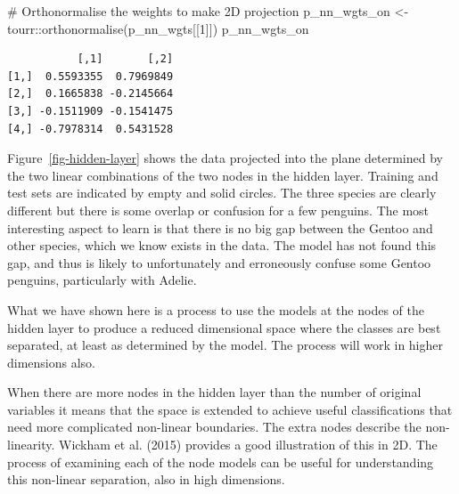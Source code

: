 \documentclass[
  letterpaper,
]{krantz}
\newenvironment{Shaded}{\begin{snugshade}}{\end{snugshade}}
\newcommand{\CommentTok}[1]{\textcolor[rgb]{0.37,0.37,0.37}{#1}}
\newcommand{\DecValTok}[1]{\textcolor[rgb]{0.68,0.00,0.00}{#1}}
\newcommand{\FunctionTok}[1]{\textcolor[rgb]{0.28,0.35,0.67}{#1}}
\newcommand{\NormalTok}[1]{\textcolor[rgb]{0.00,0.23,0.31}{#1}}
\newcommand{\OtherTok}[1]{\textcolor[rgb]{0.00,0.23,0.31}{#1}}
\newcommand{\SpecialCharTok}[1]{\textcolor[rgb]{0.37,0.37,0.37}{#1}}
\begin{document}
\begin{Shaded}
\begin{Highlighting}[]
\CommentTok{\# Orthonormalise the weights to make 2D projection}
\NormalTok{p\_nn\_wgts\_on }\OtherTok{\textless{}{-}}\NormalTok{ tourr}\SpecialCharTok{::}\FunctionTok{orthonormalise}\NormalTok{(p\_nn\_wgts[[}\DecValTok{1}\NormalTok{]])}
\NormalTok{p\_nn\_wgts\_on}
\end{Highlighting}
\end{Shaded}

\begin{verbatim}
           [,1]       [,2]
[1,]  0.5593355  0.7969849
[2,]  0.1665838 -0.2145664
[3,] -0.1511909 -0.1541475
[4,] -0.7978314  0.5431528
\end{verbatim}

Figure~\ref{fig-hidden-layer} shows the data projected into the plane
determined by the two linear combinations of the two nodes in the hidden
layer. Training and test sets are indicated by empty and solid circles.
The three species are clearly different but there is some overlap or
confusion for a few penguins. The most interesting aspect to learn is
that there is no big gap between the Gentoo and other species, which we
know exists in the data. The model has not found this gap, and thus is
likely to unfortunately and erroneously confuse some Gentoo penguins,
particularly with Adelie.

What we have shown here is a process to use the models at the nodes of
the hidden layer to produce a reduced dimensional space where the
classes are best separated, at least as determined by the model. The
process will work in higher dimensions also.

When there are more nodes in the hidden layer than the number of
original variables it means that the space is extended to achieve useful
classifications that need more complicated non-linear boundaries. The
extra nodes describe the non-linearity. Wickham et al. (2015) provides a
good illustration of this in 2D. The process of examining each of the
node models can be useful for understanding this non-linear separation,
also in high dimensions.
\end{document}
